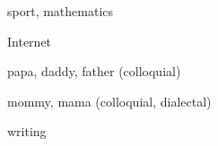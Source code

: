 \documentclass[avery5371,grid,frame]{flashcards}
\begin{document}
\begin{flashcard}{\LARGE sport, mathematics}
\LARGE {}
\end{flashcard}
\begin{flashcard}{\LARGE Internet}
\LARGE {}
\end{flashcard}
\begin{flashcard}{\LARGE papa, daddy, father (colloquial)}
\LARGE {}
\end{flashcard}
\begin{flashcard}{\LARGE mommy, mama (colloquial, dialectal)}
\LARGE {}
\end{flashcard}
\begin{flashcard}{\LARGE writing}
\LARGE {}
\end{flashcard}
\end{document}
